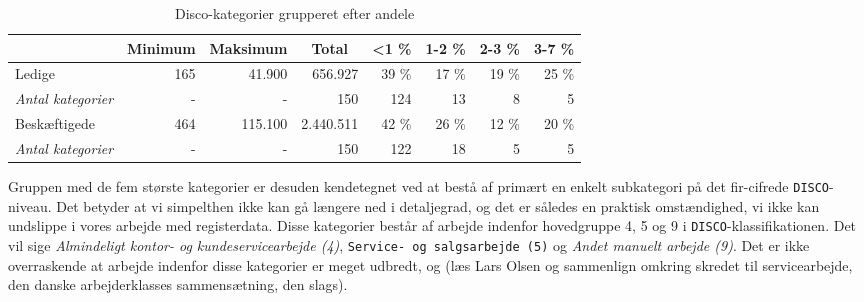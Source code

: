 \begin{table}[H]
\centering
\caption{Disco-kategorier grupperet efter andele}
\label{tab_discokat_grup}
\begin{tabular}{@{}lrrrrrrr@{}}
\toprule
\multicolumn{1}{c}{}      & \multicolumn{1}{c}{Minimum} & \multicolumn{1}{c}{Maksimum} & \multicolumn{1}{c}{Total} & \multicolumn{1}{c}{\textless 1 \%} & \multicolumn{1}{c}{1-2 \%} & \multicolumn{1}{c}{2-3 \%} & \multicolumn{1}{c}{3-7 \%} \\ \midrule
Ledige                    & 165                         & 41.900                       & 656.927                   & 39 \%                              & 17 \%                      & 19 \%                      & 25 \%                      \\
\textit{Antal kategorier} & -                           & -                            & 150                       & 124                                & 13                         & 8                          & 5                          \\
Beskæftigede              & 464                         & 115.100                      & 2.440.511                 & 42 \%                              & 26 \%                      & 12 \%                      & 20 \%                      \\
\textit{Antal kategorier} & -                           & -                            & 150                       & 122                                & 18                         & 5                          & 5                          \\ \bottomrule
\end{tabular}
\end{table}
% 
Gruppen med de fem største kategorier er desuden kendetegnet ved at bestå af primært en enkelt subkategori på det fir-cifrede \texttt{DISCO}-niveau. Det betyder at vi simpelthen ikke kan gå længere ned i detaljegrad, og det er således en praktisk omstændighed, vi ikke kan undslippe i vores arbejde med registerdata. Disse kategorier består af arbejde indenfor hovedgruppe 4, 5 og 9 i \texttt{DISCO}-klassifikationen. Det vil sige \emph{Almindeligt kontor- og kundeservicearbejde (4)}, \texttt{Service- og salgsarbejde (5)} og \emph{Andet manuelt arbejde (9)}. Det er ikke overraskende at arbejde indenfor disse kategorier er meget udbredt, og (læs Lars Olsen og sammenlign omkring skredet til servicearbejde, den danske arbejderklasses sammensætning, den slags). %
 

